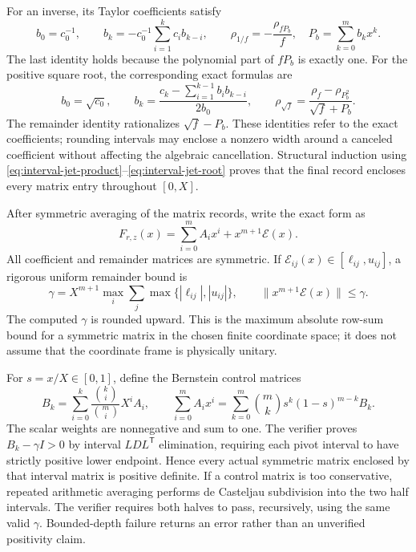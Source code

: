 For an inverse, its Taylor coefficients satisfy
\begin{equation}\label{eq:interval-jet-inverse}
 b_0=c_0^{-1},\qquad
 b_k=-c_0^{-1}\sum_{i=1}^kc_i b_{k-i},\qquad
 \rho_{1/f}=-\frac{\rho_{fP_b}}{f},\quad
 P_b=\sum_{k=0}^mb_kx^k.
\end{equation}
The last identity holds because the polynomial part of $fP_b$ is exactly
one. For the positive square root, the corresponding exact formulas are
\begin{equation}\label{eq:interval-jet-root}
 b_0=\sqrt{c_0},\qquad
 b_k=\frac{c_k-\sum_{i=1}^{k-1}b_ib_{k-i}}{2b_0},\qquad
 \rho_{\sqrt f}=\frac{\rho_f-\rho_{P_b^2}}{\sqrt f+P_b}.
\end{equation}
The remainder identity rationalizes $\sqrt f-P_b$. These identities refer
to the exact coefficients; rounding intervals may enclose a nonzero
width around a canceled coefficient without affecting the algebraic
cancellation. Structural induction using
\eqref{eq:interval-jet-product}--\eqref{eq:interval-jet-root} proves that
the final record encloses every matrix entry throughout $[0,X]$.

After symmetric averaging of the matrix records, write the exact form as
\begin{equation}
 F_{r,z}(x)=\sum_{i=0}^m A_ix^i+x^{m+1}\mathcal E(x).
\end{equation}
All coefficient and remainder matrices are symmetric. If
$\mathcal E_{ij}(x)\in[\ell_{ij},u_{ij}]$, a rigorous uniform remainder
bound is
\begin{equation}\label{eq:interval-remainder-norm}
 \gamma=X^{m+1}\max_i\sum_j
              \max\{|\ell_{ij}|,|u_{ij}|\},\qquad
 \|x^{m+1}\mathcal E(x)\|\le\gamma.
\end{equation}
The computed $\gamma$ is rounded upward. This is the maximum absolute
row-sum bound for a symmetric matrix in the chosen finite coordinate
space; it does not assume that the coordinate frame is physically unitary.

For $s=x/X\in[0,1]$, define the Bernstein control matrices
\begin{equation}\label{eq:interval-Bernstein}
 B_k=\sum_{i=0}^k\frac{\binom ki}{\binom mi}X^i A_i,
 \qquad
 \sum_{i=0}^m A_ix^i
 =\sum_{k=0}^m\binom mk s^k(1-s)^{m-k}B_k.
\end{equation}
The scalar weights are nonnegative and sum to one. The verifier proves
$B_k-\gamma I>0$ by interval $LDL^{\mathsf T}$ elimination, requiring
each pivot interval to have strictly positive lower endpoint. Hence
every actual symmetric matrix enclosed by that interval matrix is
positive definite. If a control matrix is too conservative, repeated
arithmetic averaging performs de Casteljau subdivision into the two
half intervals. The verifier requires both halves to pass, recursively,
using the same valid $\gamma$. Bounded-depth failure returns an error
rather than an unverified positivity claim.


